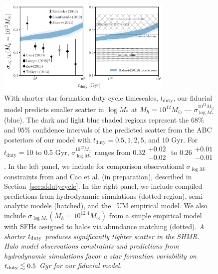 \documentclass[12pt, letterpaper, preprint, tighten]{aastex62}
\newcommand{\edt}[1]{{\color{dred}{\bf} #1}}
\newcommand{\tduty}{t_{\rm duty}}
\newcommand{\siglogm}{\sigma_{\log M_*}}
\begin{document}
\begin{figure}
\begin{center}
\includegraphics[width=0.75\textwidth]{figs/SHMRscatter_tduty_v2.pdf}
    \caption{With shorter star formation duty cycle timescales, $t_\mathrm{duty}$,
    our \edt{fiducial} model predicts smaller scatter in $\log M_*$ at
    $M_h = 10^{12} M_\odot$ --- $\siglogm^{10^{12} M_\odot}$ (blue). 
    The dark and light blue shaded regions represent the $68\%$ and $95\%$ confidence
    intervals of the predicted scatter from the ABC posteriors of our
    model with $t_\mathrm{duty} = 0.5, 1, 2, 5$, and $10$ Gyr. For $t_\mathrm{duty} = 10$
    to $0.5$ Gyr, $\siglogm^{10^{12} M_\odot}$ ranges from $0.32\substack{+0.02\\ -0.02}$ to
    $0.26\substack{+0.01\\-0.01}$. In the left panel, we include for comparison
    observational $\siglogm$ constraints from \cite{yang2009, more2011, leauthaud2012, zu2015, tinker2017, lange2018a}
    and Cao et al. (in preparation), described in Section~\ref{sec:sfdutycycle}.
    In the right panel, we include compiled predictions from hydrodyanmic simulations
    (dotted region), semi-analytic models (hatched), and
    \edt{the~\cite{behroozi2018} {\sc UM} empirical model. We also include 
    $\siglogm(M_h = 10^{12.4} M_\odot)$ from a simple empirical model with \cite{abramson2016} 
    SFHs assigned to halos via abundance matching (dotted).}
    \edt{\emph{A shorter $\tduty$ produces significantly tighter scatter in the SHMR.
    Halo model observations constraints and predictions from hydrodynamic simulations
    favor a star formation variability on $\tduty \lesssim 0.5$ Gyr for our fiducial
    model.}}
    }
\label{fig:sigMstar_duty}
\end{center}
\end{figure}
\end{document}
